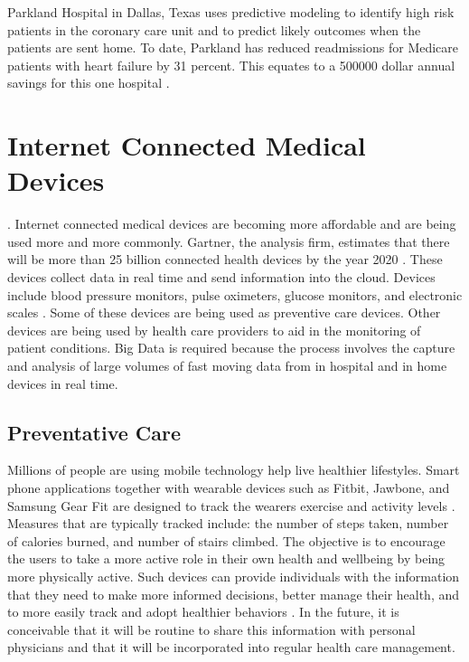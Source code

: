 \documentclass[sigconf]{acmart}
\begin{document}
Parkland Hospital in Dallas, Texas uses predictive modeling to identify high risk patients in the coronary care unit and to predict likely outcomes when the patients are sent home. To date, Parkland has reduced readmissions for Medicare patients with heart failure by 31 percent. This equates to a 500000 dollar annual savings for this one hospital \cite{www-google-data}. 

\section{Internet Connected Medical Devices}. 
Internet connected medical devices are becoming more affordable and are being used more and more commonly.  Gartner, the analysis firm, estimates that there will be more than 25 billion connected health devices by the year 2020 \cite{www-google-HlthCat}. These devices collect data in real time and send information into the cloud. Devices include blood pressure monitors, pulse oximeters, glucose monitors, and electronic scales \cite{www-google-HlthCat}.  Some of these devices are being used as preventive care devices. Other devices are being used by health care providers to aid in the monitoring of patient conditions.  Big Data is required because the process involves the capture and analysis of large volumes of fast moving data from in hospital and in home devices in real time.

\subsection{Preventative Care}
Millions of people are using mobile technology help live healthier lifestyles. Smart phone applications together with wearable devices such as Fitbit, Jawbone, and Samsung Gear Fit are designed to track the wearers exercise and activity levels \cite{www-google-forbes042015}. Measures that are typically tracked include: the number of steps taken, number of calories burned, and number of stairs climbed. The objective is to encourage the users to take a more active role in their own health and wellbeing by being more physically active. Such devices can provide individuals with the information that they need to make more informed decisions, better manage their health,  and to more easily track and adopt healthier behaviors \cite{milbank}.  In the future, it is conceivable that it will be routine to share this information with personal physicians and that it will be incorporated into regular health care management. 
\end{document}
